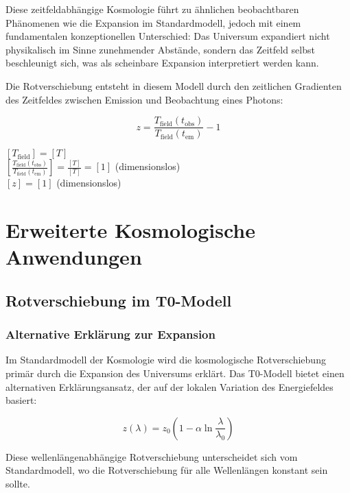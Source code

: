 \documentclass[12pt,a4paper]{article}
\theoremstyle{definition}
\begin{document}
Diese zeitfeldabhängige Kosmologie führt zu ähnlichen beobachtbaren Phänomenen wie die Expansion im Standardmodell, jedoch mit einem fundamentalen konzeptionellen Unterschied: Das Universum expandiert nicht physikalisch im Sinne zunehmender Abstände, sondern das Zeitfeld selbst beschleunigt sich, was als scheinbare Expansion interpretiert werden kann.

Die Rotverschiebung entsteht in diesem Modell durch den zeitlichen Gradienten des Zeitfeldes zwischen Emission und Beobachtung eines Photons:

\begin{equation}
	z = \frac{T_{\text{field}}(t_{\text{obs}})}{T_{\text{field}}(t_{\text{em}})} - 1
\end{equation}

\begin{einheitencheck}
	$[T_{\text{field}}] = [T]$ \checkmark\\
	$[\frac{T_{\text{field}}(t_{\text{obs}})}{T_{\text{field}}(t_{\text{em}})}] = \frac{[T]}{[T]} = [1]$ (dimensionslos) \checkmark\\
	$[z] = [1]$ (dimensionslos) \checkmark
\end{einheitencheck}\section{Erweiterte Kosmologische Anwendungen}

\subsection{Rotverschiebung im T0-Modell}

\subsubsection{Alternative Erklärung zur Expansion}

Im Standardmodell der Kosmologie wird die kosmologische Rotverschiebung primär durch die Expansion des Universums erklärt. Das T0-Modell bietet einen alternativen Erklärungsansatz, der auf der lokalen Variation des Energiefeldes basiert:

\begin{equation}
\boxed{z(\lambda) = z_0\left(1 - \alpha \ln\frac{\lambda}{\lambda_0}\right)}
\end{equation}

Diese wellenlängenabhängige Rotverschiebung unterscheidet sich vom Standardmodell, wo die Rotverschiebung für alle Wellenlängen konstant sein sollte.
\end{document}

